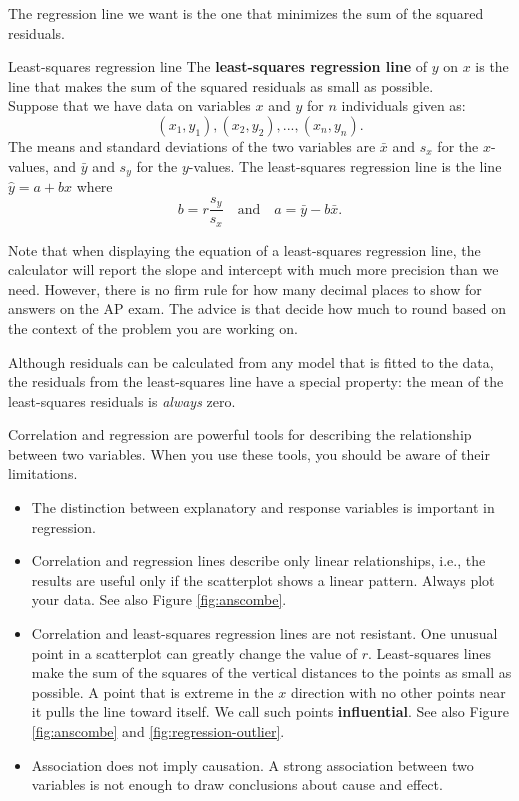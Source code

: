 The regression line we want is the one that minimizes the sum of the squared residuals.

\begin{definition}{Least-squares regression line}{}
    The \textbf{least-squares regression line} of $y$ on $x$ is the line that makes the sum of the squared residuals as small as possible.\\
    Suppose that we have data on variables $x$ and $y$ for $n$ individuals given as:
    \[
        (x_1, y_1), (x_2, y_2), ..., (x_n, y_n).
    \]
    The means and standard deviations of the two variables are $\bar{x}$ and $s_x$ for the $x$-values, and $\bar{y}$ and $s_y$ for the $y$-values. The least-squares regression line is the line $\hat{y} = a + bx$ where
    \[
        b = r \dfrac{s_y}{s_x} \quad\text{and}\quad
        a = \bar{y} - b \bar{x}.
    \]
\end{definition}

Note that when displaying the equation of a least-squares regression line, the calculator will report the slope and intercept with much more precision than we need. However, there is no firm rule for how many decimal places to show for answers on the AP exam. The advice is that decide how much to round based on the context of the problem you are working on.

Although residuals can be calculated from any model that is fitted to the data, the residuals from the least-squares line have a special property: the mean of the least-squares residuals is \textit{always} zero.

Correlation and regression are powerful tools for describing the relationship between two variables. When you use these tools, you should be aware of their limitations.

\begin{itemize}[itemsep=0cm]
\item The distinction between explanatory and response variables is important in regression.
\item Correlation and regression lines describe only linear relationships, i.e., the results are useful only if the scatterplot shows a linear pattern. Always plot your data. See also Figure \ref{fig:anscombe}.
\item Correlation and least-squares regression lines are not resistant. One unusual point in a scatterplot can greatly change the value of $r$. Least-squares lines make the sum of the squares of the vertical distances to the points as small as possible. A point that is extreme in the $x$ direction with no other points near it pulls the line toward itself. We call such points \textbf{influential}. See also Figure \ref{fig:anscombe} and \ref{fig:regression-outlier}.
\item Association does not imply causation. A strong association between two variables is not enough to draw conclusions about cause and effect.
\end{itemize}

